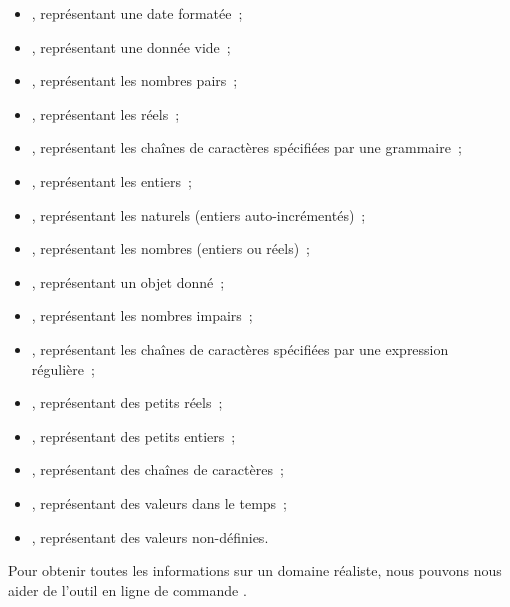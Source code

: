 \begin{itemize}
\item {}, représentant une date formatée~;

\item {}, représentant une donnée vide~;

\item {}, représentant les nombres pairs~;

\item {}, représentant les réels~;

\item {}, représentant les chaînes de caractères spécifiées par une
grammaire~;

\item {}, représentant les entiers~;

\item {}, représentant les naturels (entiers auto-incrémentés)~;

\item {}, représentant les nombres (entiers ou réels)~;

\item {}, représentant un objet donné~;

\item {}, représentant les nombres impairs~;

\item {}, représentant les chaînes de caractères spécifiées par une
expression régulière~;

\item {}, représentant des petits réels~;

\item {}, représentant des petits entiers~;

\item {}, représentant des chaînes de caractères~;

\item {}, représentant des valeurs dans le temps~;

\item {}, représentant des valeurs non-définies.

\end{itemize}

Pour obtenir toutes les informations sur un domaine réaliste, nous pouvons nous
aider de l'outil en ligne de commande .

